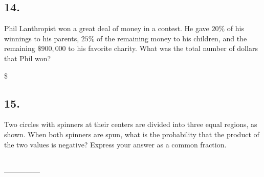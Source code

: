 \documentclass[12pt]{article}
\begin{document}
\subsection*{14.}
Phil Lanthropist won a great deal of money in a contest. He gave $20\%$ of his winnings to his parents, $25\%$ of the remaining money to his children, and the remaining $\$900,000$ to his favorite charity. What was the total number of dollars that Phil won?

\nopagebreak

\$~\fbox{\phantom{ANSWER}}

\begin{answer}
%
\end{answer}


\subsection*{15.}
Two circles with spinners at their centers are divided into three equal regions, as shown. When both spinners are spun, what is the probability that the product of the two values is negative? Express your answer as a common fraction.

\nopagebreak

\begin{minipage}[b]{\linewidth}
\fbox{\phantom{ANSWER}}\\
\mbox{---------------}\\
\fbox{\phantom{ANSWER}}
\end{minipage}
\end{document}

